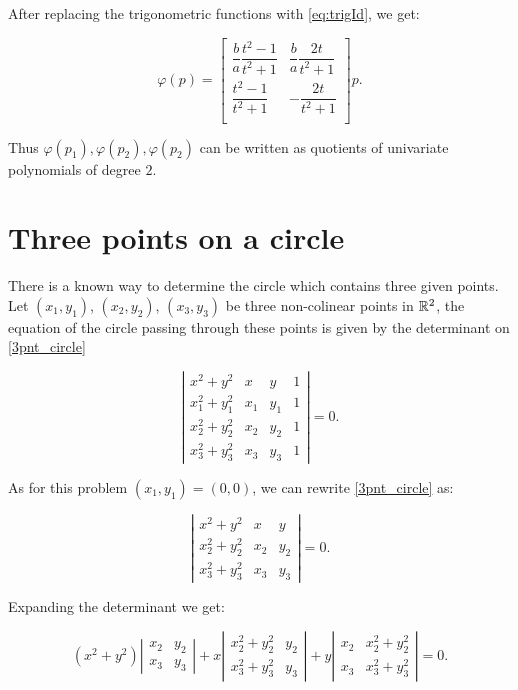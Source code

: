 After replacing the trigonometric functions with \autoref{eq:trigId}, we get:

\begin{equation}
\varphi(p)=\left[\begin{array}{cc}
\dfrac{b}{a}\dfrac{t^2-1}{t^2+1}& \dfrac{b}{a}\dfrac{2t}{t^2+1}\\
\dfrac{t^2-1}{t^2+1}& -\dfrac{2t}{t^2+1}\\
\end{array}\right]p.
\end{equation}

Thus $\varphi(p_1), \varphi(p_2), \varphi(p_2)$ can be written as quotients of univariate polynomials of degree $2$.

\section{Three points on a circle}
There is a known way to determine the circle which contains three given points. 
Let $(x_1, y_1)$, $(x_2, y_2)$, $(x_3, y_3)$ be three non-colinear points in $\mathbb{R}^2$, the equation of the circle passing through these points is given by the determinant on \autoref{3pnt_circle}

\begin{equation}\label{3pnt_circle}
\left|
\begin{array}{cccc}
x^2+y^2&x&y&1\\
x_1^2+y_1^2&x_1&y_1&1\\
x_2^2+y_2^2&x_2&y_2&1\\
x_3^2+y_3^2&x_3&y_3&1
\end{array}
\right| = 0.
\end{equation}

As for this problem $(x_1, y_1)=(0,0)$, we can rewrite \autoref{3pnt_circle} as:

\begin{equation}
\left|
\begin{array}{ccc}
x^2+y^2&x&y\\
x_2^2+y_2^2&x_2&y_2\\
x_3^2+y_3^2&x_3&y_3
\end{array}
\right| = 0.
\end{equation}

Expanding the determinant we get:

\begin{equation*}
(x^2+y^2)\left|
\begin{array}{cc}
x_2&y_2\\
x_3&y_3
\end{array}\right|
+
x\left|
\begin{array}{cc}
x_2^2+y_2^2&y_2\\
x_3^2+y_3^2&y_3
\end{array}\right|
+
y\left|
\begin{array}{cc}
x_2&x_2^2+y_2^2\\
x_3&x_3^2+y_3^2
\end{array}\right|=0.
\end{equation*}

